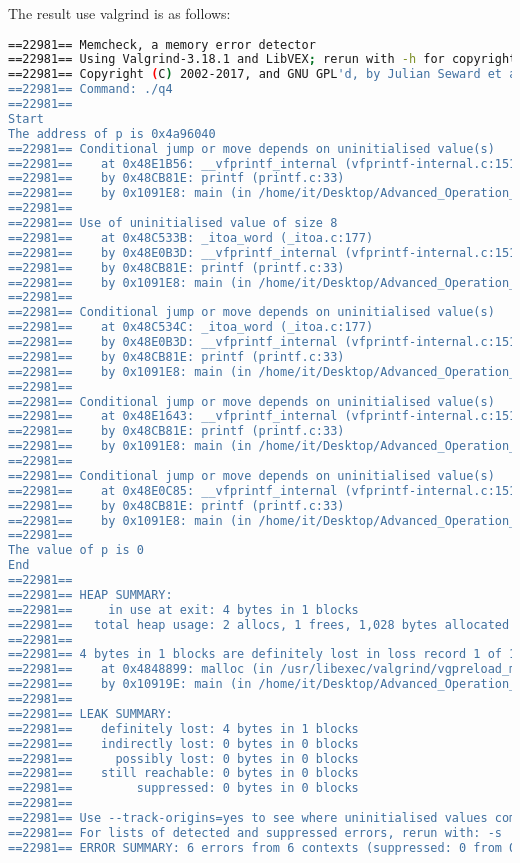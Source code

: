 \documentclass[10pt, answers]{exam}
\begin{document}
\begin{questions}
\begin{solution}
    The result use valgrind is as follows:
    \begin{lstlisting}[language=bash]
==22981== Memcheck, a memory error detector
==22981== Using Valgrind-3.18.1 and LibVEX; rerun with -h for copyright info
==22981== Copyright (C) 2002-2017, and GNU GPL'd, by Julian Seward et al.
==22981== Command: ./q4
==22981==
Start
The address of p is 0x4a96040
==22981== Conditional jump or move depends on uninitialised value(s)
==22981==    at 0x48E1B56: __vfprintf_internal (vfprintf-internal.c:1516)
==22981==    by 0x48CB81E: printf (printf.c:33)
==22981==    by 0x1091E8: main (in /home/it/Desktop/Advanced_Operation_Systen/hw3/q4)
==22981==
==22981== Use of uninitialised value of size 8
==22981==    at 0x48C533B: _itoa_word (_itoa.c:177)
==22981==    by 0x48E0B3D: __vfprintf_internal (vfprintf-internal.c:1516)
==22981==    by 0x48CB81E: printf (printf.c:33)
==22981==    by 0x1091E8: main (in /home/it/Desktop/Advanced_Operation_Systen/hw3/q4)
==22981==
==22981== Conditional jump or move depends on uninitialised value(s)
==22981==    at 0x48C534C: _itoa_word (_itoa.c:177)
==22981==    by 0x48E0B3D: __vfprintf_internal (vfprintf-internal.c:1516)
==22981==    by 0x48CB81E: printf (printf.c:33)
==22981==    by 0x1091E8: main (in /home/it/Desktop/Advanced_Operation_Systen/hw3/q4)
==22981==
==22981== Conditional jump or move depends on uninitialised value(s)
==22981==    at 0x48E1643: __vfprintf_internal (vfprintf-internal.c:1516)
==22981==    by 0x48CB81E: printf (printf.c:33)
==22981==    by 0x1091E8: main (in /home/it/Desktop/Advanced_Operation_Systen/hw3/q4)
==22981==
==22981== Conditional jump or move depends on uninitialised value(s)
==22981==    at 0x48E0C85: __vfprintf_internal (vfprintf-internal.c:1516)
==22981==    by 0x48CB81E: printf (printf.c:33)
==22981==    by 0x1091E8: main (in /home/it/Desktop/Advanced_Operation_Systen/hw3/q4)
==22981==
The value of p is 0
End
==22981==
==22981== HEAP SUMMARY:
==22981==     in use at exit: 4 bytes in 1 blocks
==22981==   total heap usage: 2 allocs, 1 frees, 1,028 bytes allocated
==22981==
==22981== 4 bytes in 1 blocks are definitely lost in loss record 1 of 1
==22981==    at 0x4848899: malloc (in /usr/libexec/valgrind/vgpreload_memcheck-amd64-linux.so)
==22981==    by 0x10919E: main (in /home/it/Desktop/Advanced_Operation_Systen/hw3/q4)
==22981==
==22981== LEAK SUMMARY:
==22981==    definitely lost: 4 bytes in 1 blocks
==22981==    indirectly lost: 0 bytes in 0 blocks
==22981==      possibly lost: 0 bytes in 0 blocks
==22981==    still reachable: 0 bytes in 0 blocks
==22981==         suppressed: 0 bytes in 0 blocks
==22981==
==22981== Use --track-origins=yes to see where uninitialised values come from
==22981== For lists of detected and suppressed errors, rerun with: -s
==22981== ERROR SUMMARY: 6 errors from 6 contexts (suppressed: 0 from 0)


\end{lstlisting}
\end{solution}
\end{questions}
\end{document}

